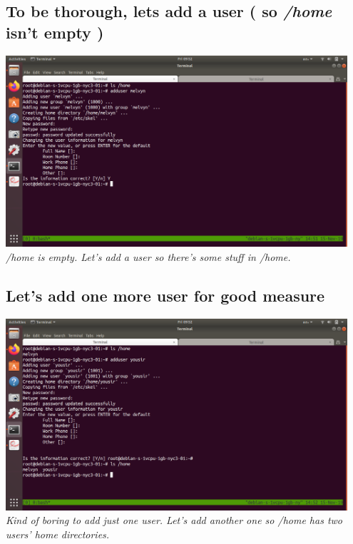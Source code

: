 \documentclass[10pt]{article}
\begin{document}
\subsection{To be thorough, lets add a user ( so \textit{/home} isn't empty )}
\begin{center}
    \includegraphics[width=0.95\textwidth]{Images/07_addUser.png}
	\textit{/home is empty. Let's add a user so there's some stuff in /home.}
\end{center}

\subsection{Let's add one more user for good measure}
\begin{center}
    \includegraphics[width=0.95\textwidth]{Images/08_addUser.png}
	\textit{Kind of boring to add just one user. Let's add another one so /home
has two users' home directories.}
\end{center}
\end{document}
